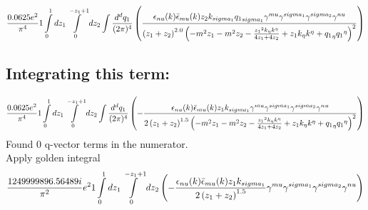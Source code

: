 \begin{dmath}\frac{0.0625 e^{2}}{\pi^{4}}1\int\limits_{ 0 }^{ 1 } d{ z_{ 1 } }\int\limits_{ 0 }^{ - { z_{ 1 } } + 1 } d{ z_{ 2 } }\int\frac{d^d q_1 }{ (2\pi)^4 }\left(\frac{\epsilon_{ \\nu }({ k }) \bar{\epsilon}_{ \\mu }({ k }) { z_{ 2 } } { { k }_{ \\sigma_1 } } { { q_1 }_{ \\sigma_1 } } { \gamma^{ \\mu } } { \gamma^{ \\sigma_1 } } { \gamma^{ \\sigma_2 } } { \gamma^{ \\nu } }}{\left({ z_{ 1 } } + { z_{ 2 } }\right)^{2.0} \left(- m^{2} { z_{ 1 } } - m^{2} { z_{ 2 } } - \frac{{ z_{ 1 } }^{2} { { k }_{ \eta } } { { k }^{ \eta } }}{4 { z_{ 1 } } + 4 { z_{ 2 } }} + { z_{ 1 } } { { k }_{ \eta } } { { k }^{ \eta } } + { { q_1 }_{ \eta } } { { q_1 }^{ \eta } }\right)^{2}}\right)\end{dmath}
\subsection*{Integrating this term:}
\begin{dmath}\frac{0.0625 e^{2}}{\pi^{4}}1\int\limits_{ 0 }^{ 1 } d{ z_{ 1 } }\int\limits_{ 0 }^{ - { z_{ 1 } } + 1 } d{ z_{ 2 } }\int\frac{d^d q_1 }{ (2\pi)^4 }\left(- \frac{\epsilon_{ \\nu }({ k }) \bar{\epsilon}_{ \\mu }({ k }) { z_{ 1 } } { { k }_{ \\sigma_1 } } { \gamma^{ \\mu } } { \gamma^{ \\sigma_1 } } { \gamma^{ \\sigma_2 } } { \gamma^{ \\nu } }}{2 \left({ z_{ 1 } } + { z_{ 2 } }\right)^{1.5} \left(- m^{2} { z_{ 1 } } - m^{2} { z_{ 2 } } - \frac{{ z_{ 1 } }^{2} { { k }_{ \eta } } { { k }^{ \eta } }}{4 { z_{ 1 } } + 4 { z_{ 2 } }} + { z_{ 1 } } { { k }_{ \eta } } { { k }^{ \eta } } + { { q_1 }_{ \eta } } { { q_1 }^{ \eta } }\right)^{2}}\right)\end{dmath}
Found 0 q-vector terms in the numerator.\\
Apply golden integral
\begin{dmath}\frac{1249999896.56489 i}{\pi^{2}} e^{2}1\int\limits_{ 0 }^{ 1 } d{ z_{ 1 } }\int\limits_{ 0 }^{ - { z_{ 1 } } + 1 } d{ z_{ 2 } }\left(- \frac{\epsilon_{ \\nu }({ k }) \bar{\epsilon}_{ \\mu }({ k }) { z_{ 1 } } { { k }_{ \\sigma_1 } }}{2 \left({ z_{ 1 } } + { z_{ 2 } }\right)^{1.5}} { \gamma^{ \\mu } } { \gamma^{ \\sigma_1 } } { \gamma^{ \\sigma_2 } } { \gamma^{ \\nu } }\right)\end{dmath}
